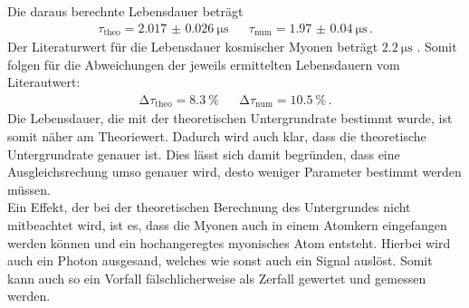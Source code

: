 \noindent
Die daraus berechnte Lebensdauer beträgt
\begin{align*}
    \tau_\text{theo} = \SI{2.017(26)}{\micro\second} && \tau_\text{num} = \SI{1.97(4)}{\micro\second} \, .
\end{align*}
Der Literaturwert für die Lebensdauer kosmischer Myonen beträgt $\SI{2.2}{\micro\second}$ \cite{pdg}.
Somit folgen für die Abweichungen der jeweils ermittelten Lebensdauern vom Literautwert:
\begin{align*}
    \increment \tau_\text{theo} = \SI{8.3}{\percent} && \increment \tau_\text{num} = \SI{10.5}{\percent} \, .
\end{align*}
Die Lebensdauer, die mit der theoretischen Untergrundrate bestimmt wurde, ist somit näher am Theoriewert.
Dadurch wird auch klar, dass die theoretische Untergrundrate genauer ist. Dies lässt sich damit begründen, 
dass eine Ausgleichsrechung umso genauer wird, desto weniger Parameter bestimmt werden müssen. \\
Ein Effekt, der bei der theoretischen Berechnung des Untergrundes nicht mitbeachtet wird, ist es, dass die Myonen auch in einem 
Atomkern eingefangen werden können und ein hochangeregtes myonisches Atom entsteht. 
Hierbei wird auch ein Photon ausgesand, welches wie sonst auch ein Signal auslöst. Somit kann auch so ein Vorfall fälschlicherweise als
Zerfall gewertet und gemessen werden. 